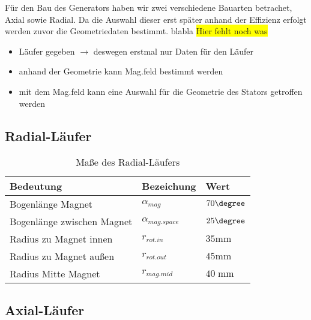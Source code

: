 Für den Bau des Generators haben wir zwei verschiedene Bauarten betrachet, Axial sowie Radial. Da die Auswahl dieser erst später anhand der Effizienz erfolgt werden zuvor die Geometriedaten bestimmt. blabla \colorbox{yellow}{Hier fehlt noch was}
\begin{itemize}
	\item Läufer gegeben $\rightarrow$ deswegen erstmal nur Daten für den Läufer
	\item anhand der Geometrie kann Mag.feld bestimmt werden 
	\item mit dem Mag.feld kann eine Auswahl für die Geometrie des Stators getroffen werden
\end{itemize}

\subsection{Radial-Läufer}

\begin{table}[h!]

\centering
\caption{Maße des Radial-Läufers}
\label{tab:radial_lauf}
\renewcommand{\arraystretch}{2}
\setlength{\tabcolsep}{7mm}

\begin{tabular}{lll}
    \toprule
     Bedeutung & Bezeichung & Wert\\
    \midrule

	Bogenlänge Magnet&$\alpha_ {mag}$&$70\degree$\\
	Bogenlänge zwischen Magnet&$\alpha_ {mag.space}$& $25 \degree $ \\
	Radius zu Magnet innen&$r_{rot.in} $&$ 35 \text{mm}$\\
	Radius zu Magnet außen&$r_{rot.out}$&$ 45 \text{mm}$\\
	Radius Mitte Magnet &$r_{mag.mid}$&$40\; \text{mm}$\\

    \bottomrule
  \end{tabular}
\end{table}

\subsection{Axial-Läufer}

